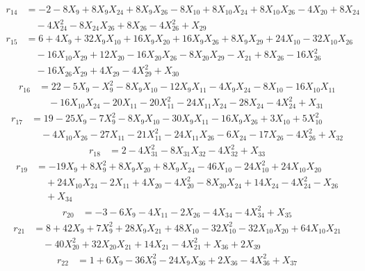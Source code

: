 \begin{align*}
r_{14}&=-2-8X_{9}+8X_{9}X_{24}+8X_{9}X_{26}-8X_{10}+8X_{10}X_{24}+8X_{10}X_{26}-4X_{20}+8X_{24}\\
&\quad -4X_{24}^{2}-8X_{24}X_{26}+8X_{26}-4X_{26}^{2}+X_{29}
\end{align*}
\begin{align*}
r_{15}&=6+4X_{9}+32X_{9}X_{10}+16X_{9}X_{20}+16X_{9}X_{26}+8X_{9}X_{29}+24X_{10}-32X_{10}X_{26}\\
&\quad -16X_{10}X_{29}+12X_{20}-16X_{20}X_{26}-8X_{20}X_{29}-X_{21}+8X_{26}-16X_{26}^{2}\\
&\quad -16X_{26}X_{29}+4X_{29}-4X_{29}^{2}+X_{30}
\end{align*}
\begin{align*}
r_{16}&=22-5X_{9}-X_{9}^{2}-8X_{9}X_{10}-12X_{9}X_{11}-4X_{9}X_{24}-8X_{10}-16X_{10}X_{11}\\
&\quad -16X_{10}X_{24}-20X_{11}-20X_{11}^{2}-24X_{11}X_{24}-28X_{24}-4X_{24}^{2}+X_{31}
\end{align*}
\begin{align*}
r_{17}&=19-25X_{9}-7X_{9}^{2}-8X_{9}X_{10}-30X_{9}X_{11}-16X_{9}X_{26}+3X_{10}+5X_{10}^{2}\\
&\quad -4X_{10}X_{26}-27X_{11}-21X_{11}^{2}-24X_{11}X_{26}-6X_{24}-17X_{26}-4X_{26}^{2}+X_{32}
\end{align*}
\begin{align*}
r_{18}&=2-4X_{31}^{2}-8X_{31}X_{32}-4X_{32}^{2}+X_{33}
\end{align*}
\begin{align*}
r_{19}&=-19X_{9}+8X_{9}^{2}+8X_{9}X_{20}+8X_{9}X_{24}-46X_{10}-24X_{10}^{2}+24X_{10}X_{20}\\
&\quad +24X_{10}X_{24}-2X_{11}+4X_{20}-4X_{20}^{2}-8X_{20}X_{24}+14X_{24}-4X_{24}^{2}-X_{26}\\
&\quad +X_{34}
\end{align*}
\begin{align*}
r_{20}&=-3-6X_{9}-4X_{11}-2X_{26}-4X_{34}-4X_{34}^{2}+X_{35}
\end{align*}
\begin{align*}
r_{21}&=8+42X_{9}+7X_{9}^{2}+28X_{9}X_{21}+48X_{10}-32X_{10}^{2}-32X_{10}X_{20}+64X_{10}X_{21}\\
&\quad -40X_{20}^{2}+32X_{20}X_{21}+14X_{21}-4X_{21}^{2}+X_{36}+2X_{39}
\end{align*}
\begin{align*}
r_{22}&=1+6X_{9}-36X_{9}^{2}-24X_{9}X_{36}+2X_{36}-4X_{36}^{2}+X_{37}
\end{align*}
